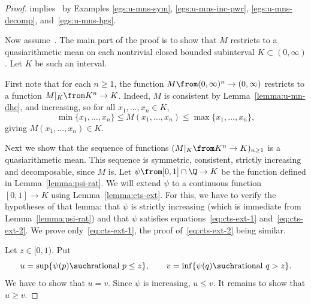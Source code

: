 \begin{proof}
 implies~ by Examples
\ref{egs:u-mns-sym}, \ref{egs:u-mns-inc-pwr},
\ref{egs:u-mns-decomp}, and~\ref{egs:u-mns-hgs}.

Now assume~.  The main part of the proof is to
show that $M$ restricts to a quasiarithmetic mean on each nontrivial closed
bounded subinterval $K \subset (0, \infty)$.  Let $K$ be such an interval.

First note that for each $n \geq 1$, the function $M \from (0, \infty)^n
\to (0, \infty)$ restricts to a function $M|_K \from K^n \to K$.  Indeed,
$M$ is consistent by Lemma~\ref{lemma:u-mn-dhc}, and increasing, so for all
$x_1, \ldots, x_n \in K$,
\[
\min \{ x_1, \ldots, x_n \}
\leq
M(x_1, \ldots, x_n)
\leq
\max \{ x_1, \ldots, x_n \},
\]
giving $M(x_1, \ldots, x_n) \in K$. 

Next we show that the sequence of functions $(M|_K \from K^n \to K)_{n \geq
  1}$ is a quasiarithmetic mean.  This sequence is symmetric, consistent,
strictly increasing and decomposable, since $M$ is.  Let $\psi \from [0, 1]
\cap \Q \to K$ be the function defined in Lemma~\ref{lemma:psi-rat}.  We
will extend $\psi$ to a continuous function $[0, 1] \to K$ using
Lemma~\ref{lemma:cts-ext}.  For this, we have to verify the hypotheses of
that lemma: that $\psi$ is strictly increasing (which is immediate from
Lemma~\ref{lemma:psi-rat}) and that $\psi$ satisfies
equations~\eqref{eq:cts-ext-1} and~\eqref{eq:cts-ext-2}.  We prove
only~\eqref{eq:cts-ext-1}, the proof of~\eqref{eq:cts-ext-2} being 
similar.

Let $z \in [0, 1)$.  Put
\[
u
=
\sup \{ \psi(p) \such \text{rational } p \leq z \},
\qquad
v
=
\inf \{ \psi(q) \such \text{rational } q > z \}.
\]
We have to show that $u = v$.  Since $\psi$ is increasing, $u \leq v$.  It
remains to show that $u \geq v$.


\end{proof}
